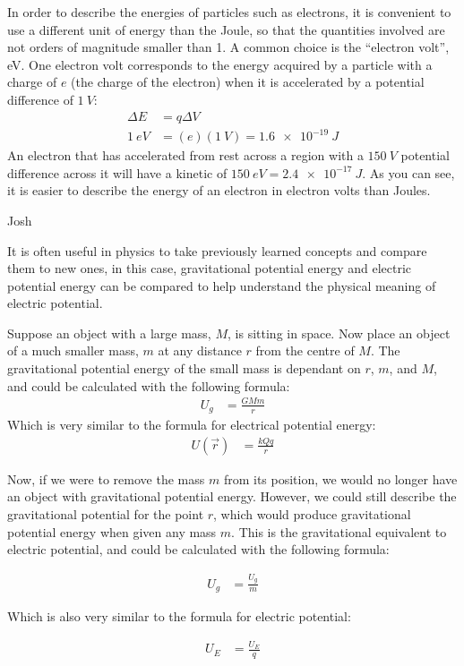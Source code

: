 In order to describe the energies of particles such as electrons, it is convenient to use a different unit of energy than the Joule, so that the quantities involved are not orders of magnitude smaller than 1. A common choice is the ``electron volt'', \si{eV}. One electron volt corresponds to the energy acquired by a particle with a charge of $e$ (the charge of the electron) when it is accelerated by a potential difference of $\SI{1}{V}$:
\begin{align*}
\Delta E &= q\Delta V\\
\SI{1}{eV}&=(e)(\SI{1}{V})=\SI{1.6e-19}{J}
\end{align*}
An electron that has accelerated from rest across a region with a $\SI{150}{V}$ potential difference across it will have a kinetic of $\SI{150}{eV}=\SI{2.4e-17}{J}$. As you can see, it is easier to describe the energy of an electron in electron volts than Joules.

\begin{studentOpinion}{Josh}
	
	It is often useful in physics to take previously learned concepts and compare them to new ones, in this case, gravitational potential energy and electric potential energy can be compared to help understand the physical meaning of electric potential. 
	
	Suppose an object with a large mass, $M$, is sitting in space. Now place an object of a much smaller mass, $m$ at any distance $r$ from the centre of $M$. The gravitational potential energy of the small mass is dependant on $r$, $m$, and $M$, and could be calculated with the following formula:
	\begin{align*}
	U_g&=\frac{GMm}{r}
	\end{align*}
	Which is very similar to the formula for electrical potential energy:
	\begin{align*}
	U(\vec r)&=\frac{kQq}{r}
	\end{align*}
	
	Now, if we were to remove the mass $m$ from its position, we would no longer have an object with gravitational potential energy. However, we could still describe the gravitational potential for the point $r$, which would produce gravitational potential energy when given any mass $m$. This is the gravitational equivalent to electric potential, and could be calculated with the following formula:
	
	\begin{align*}
	U_g&=\frac{U_g}{m}
	\end{align*}
	
	Which is also very similar to the formula for electric potential:
	
	\begin{align*}
	U_E&=\frac{U_E}{q}
	\end{align*}

	
		
\end{studentOpinion}

